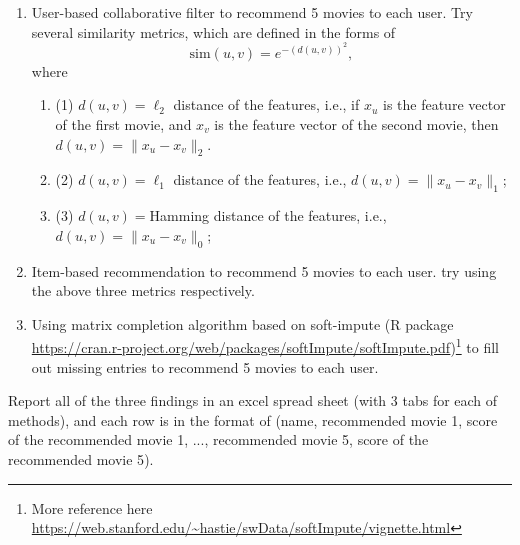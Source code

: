 \documentclass[11pt]{article}
\begin{document}
\begin{enumerate}
\begin{enumerate}
\item User-based collaborative filter to recommend 5 movies to each user. Try several similarity metrics, which are defined in the forms of 
\[
\mbox{sim}(u, v) = e^{-(d(u, v))^2},
\]
where \begin{enumerate}
\item (1) $d(u, v) = \ell_2$ distance of the features, i.e., if $x_u$ is the feature vector of the first movie, and  $x_v$ is the feature vector of the second movie, then $d(u, v) = \|x_u - x_v\|_2$. 
\item (2) $d(u, v) = \ell_1$ distance of the features, i.e.,  $d(u, v) = \|x_u - x_v\|_1$; 
\item (3) $d(u, v) = $Hamming distance of the features, i.e., $d(u, v) = \|x_u - x_v\|_0$; 
\end{enumerate}
\item Item-based recommendation to recommend 5 movies to each user. try using the above three metrics respectively. 
\item Using matrix completion algorithm based on soft-impute (R package \url{https://cran.r-project.org/web/packages/softImpute/softImpute.pdf})\footnote{More reference here \url{https://web.stanford.edu/~hastie/swData/softImpute/vignette.html}} to fill out missing entries to recommend 5 movies to each user.
\end{enumerate}

Report all of the three findings in an excel spread sheet (with 3 tabs for each of methods), and each row is in the format of \textsf{(name,  recommended movie 1, score of the recommended movie 1, ..., recommended movie 5, score of the recommended movie 5}).


\end{enumerate}
\end{document}
